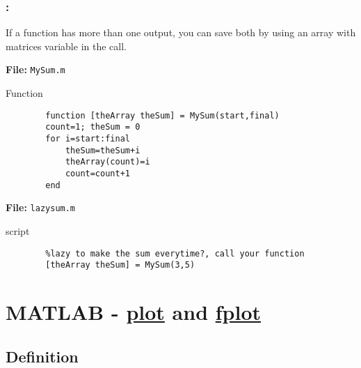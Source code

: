 \documentclass[11pt]{beamer}
\begin{document}
\begin{frame}[fragile]
	
	\frametitle{\secname : \subsecname}
	\vspace{-5pt}
	If a function has more than one output, you can save both by using an array with matrices variable in the call. 	
	
	\textbf{File:} \verb|MySum.m|
	\vspace{-3pt}
	\begin{exampleblock}{Function}
		\vspace{-1pt}
		\begin{verbatim}
		function [theArray theSum] = MySum(start,final)
		count=1; theSum = 0
		for i=start:final
		    theSum=theSum+i
		    theArray(count)=i
		    count=count+1
		end
		\end{verbatim}
	\end{exampleblock}
	
	\textbf{File:} \verb|lazysum.m|	
	\vspace{-1pt}
	\begin{block}{script}
		\vspace{-1pt}
		\begin{verbatim}
		%lazy to make the sum everytime?, call your function
		[theArray theSum] = MySum(3,5)
		\end{verbatim}	
	\end{block}
	

	\begin{minipage}[t]{0.43\linewidth}
	\hspace{5pt}	
	\end{minipage}
	
\end{frame}

\section{MATLAB - \href{http://www.mathworks.com/help/matlab/ref/plot.html}{plot} and \href{http://www.mathworks.com/help/matlab/ref/fplot.html}{fplot}}

\subsection{Definition}
\end{document}

